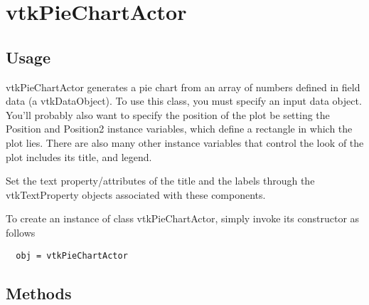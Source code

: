 \section{vtkPieChartActor}

\subsection{Usage}

 vtkPieChartActor generates a pie chart from an array of numbers defined in
 field data (a vtkDataObject). To use this class, you must specify an input
 data object. You'll probably also want to specify the position of the plot
 be setting the Position and Position2 instance variables, which define a
 rectangle in which the plot lies.  There are also many other instance
 variables that control the look of the plot includes its title,
 and legend.

 Set the text property/attributes of the title and the labels through the 
 vtkTextProperty objects associated with these components.

To create an instance of class vtkPieChartActor, simply
invoke its constructor as follows
\begin{verbatim}
  obj = vtkPieChartActor
\end{verbatim}
\subsection{Methods}

